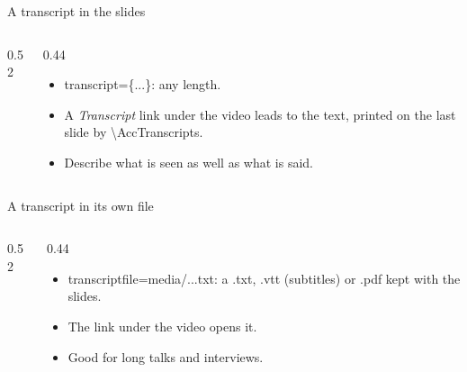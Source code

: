 \documentclass[aspectratio=169]{beamer}
\newcommand{\code}[1]{{\small\ttfamily #1}}
\begin{document}
\begin{frame}{A transcript in the slides}
  \begin{columns}[c]
    \begin{column}{0.52\textwidth}
    \end{column}
    \begin{column}{0.44\textwidth}
      \begin{itemize}
        \item \code{transcript=\{...\}}: any length.
        \item A \emph{Transcript} link under the video leads to the text, printed on the last slide by \code{\textbackslash AccTranscripts}.
        \item Describe what is seen as well as what is said.
      \end{itemize}
    \end{column}
  \end{columns}
\end{frame}

\begin{frame}{A transcript in its own file}
  \begin{columns}[c]
    \begin{column}{0.52\textwidth}
    \end{column}
    \begin{column}{0.44\textwidth}
      \begin{itemize}
        \item \code{transcriptfile=media/...txt}: a \code{.txt}, \code{.vtt} (subtitles) or \code{.pdf} kept with the slides.
        \item The link under the video opens it.
        \item Good for long talks and interviews.
      \end{itemize}
    \end{column}
  \end{columns}
\end{frame}
\end{document}
